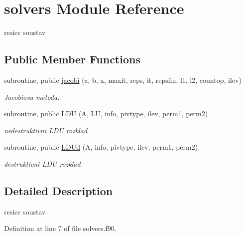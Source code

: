 \hypertarget{classsolvers}{\section{solvers \-Module \-Reference}
\label{classsolvers}
}


resice soustav  


\subsection*{\-Public \-Member \-Functions}
\begin{DoxyCompactItemize}
\item 
subroutine, public \hyperlink{classsolvers_ac4fcdb5ec5f18bb84b27408c36aafc21}{jacobi} (a, b, x, maxit, reps, it, repsfin, l1, l2, countop, ilev)
\begin{DoxyCompactList}\small\item\em \-Jacobiova metoda. \end{DoxyCompactList}\item 
subroutine, public \hyperlink{classsolvers_ac87ce7bf939f58b74022c83ebf735650}{\-L\-D\-U} (\-A, \-L\-U, info, pivtype, ilev, perm1, perm2)
\begin{DoxyCompactList}\small\item\em nedestruktivni \-L\-D\-U rozklad \end{DoxyCompactList}\item 
subroutine, public \hyperlink{classsolvers_a0687ec293c240940e9a2cab9b9427c20}{\-L\-D\-Ud} (\-A, info, pivtype, ilev, perm1, perm2)
\begin{DoxyCompactList}\small\item\em destruktivni \-L\-D\-U rozklad \end{DoxyCompactList}\end{DoxyCompactItemize}


\subsection{\-Detailed \-Description}
resice soustav 

\-Definition at line 7 of file solvers.\-f90.



